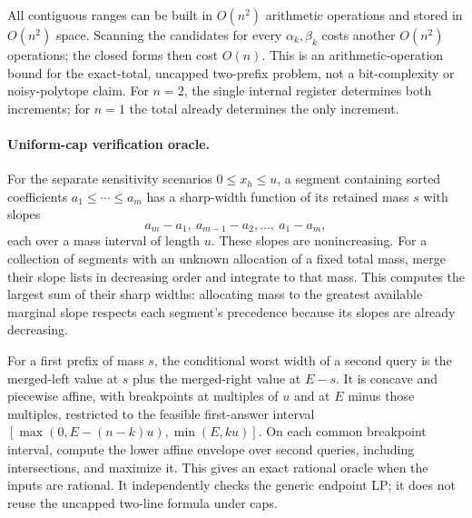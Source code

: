 All contiguous ranges can be built in $O(n^2)$ arithmetic operations
and stored in $O(n^2)$ space. Scanning the candidates for every
$\alpha_k,\beta_k$ costs another $O(n^2)$ operations; the closed forms
then cost $O(n)$. This is an arithmetic-operation bound for the exact-total,
uncapped two-prefix problem, not a bit-complexity or noisy-polytope claim.
For $n=2$, the single internal register determines both increments;
for $n=1$ the total already determines the only increment.

\paragraph{Uniform-cap verification oracle.}
For the separate sensitivity scenarios $0\leq x_h\leq u$, a segment
containing sorted coefficients $a_1\leq\cdots\leq a_m$ has a sharp-width
function of its retained mass $s$ with slopes
\[
 a_m-a_1,\ a_{m-1}-a_2,\ldots,\ a_1-a_m,
\]
each over a mass interval of length $u$. These slopes are nonincreasing.
For a collection of segments with an unknown allocation of a fixed total
mass, merge their slope lists in decreasing order and integrate to that
mass. This computes the largest sum of their sharp widths: allocating
mass to the greatest available marginal slope respects each segment's
precedence because its slopes are already decreasing.

For a first prefix of mass $s$, the conditional worst width of a second
query is the merged-left value at $s$ plus the merged-right value at
$E-s$. It is concave and piecewise affine, with breakpoints at multiples
of $u$ and at $E$ minus those multiples, restricted to the feasible
first-answer interval
$[\max(0,E-(n-k)u),\min(E,ku)]$.
On each common breakpoint interval, compute the lower affine envelope
over second queries, including intersections, and maximize it. This gives
an exact rational oracle when the inputs are rational. It independently
checks the generic endpoint LP; it does not reuse the uncapped two-line
formula under caps.
